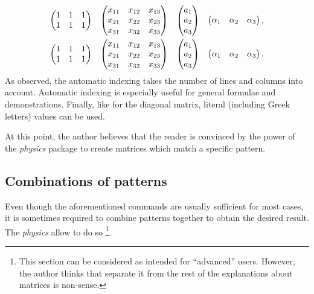 			\begin{align*}
				\begin{pmatrix}
					\xmat{1}{2}{3}
				\end{pmatrix}	&&
				\begin{pmatrix}
					\xmat*{x}{3}{3}
				\end{pmatrix}	&&
				\begin{pmatrix}
					\xmat*{a}{3}{1}
				\end{pmatrix}	&&
				\begin{pmatrix}
					\xmat*{\alpha}{1}{3}
				\end{pmatrix},	\\
				\begin{pmatrix}
					1 & 1 & 1 \\
					1 & 1 & 1
				\end{pmatrix}	&&
				\begin{pmatrix}
					x_{11} & x_{12} & x_{13} \\
					x_{21} & x_{22} & x_{23} \\
					x_{31} & x_{32} & x_{33}
				\end{pmatrix}	&&
				\begin{pmatrix}
					a_{1} \\
					a_{2} \\
					a_{3}
				\end{pmatrix}	&&
				\begin{pmatrix}
					\alpha_{1} & \alpha_{2} & \alpha_{3}
				\end{pmatrix}.
			\end{align*}
			As observed, the automatic indexing takes the number of lines and columns into account.
			Automatic indexing is especially useful for general formulae and demonstrations.
			Finally, like for the diagonal matrix, literal (including Greek letters) values can be used.
			
			At this point, the author believes that the reader is convinced by the power of the \emph{physics} package to create matrices which match a specific pattern.
			
	
	
	\subsection{Combinations of patterns}
	
	
		Even though the aforementioned commands are usually sufficient for most cases, it is sometimes required to combine patterns together to obtain the desired result.
		The \emph{physics} allow to do so \footnote{This section can be considered as intended for \enquote{advanced} users. However, the author thinks that separate it from the rest of the explanations about matrices is non-sense.}.
		
